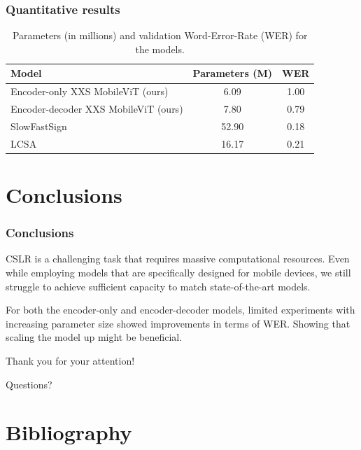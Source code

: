\documentclass[english, xcolor={table}]{beamer}
\begin{document}
\begin{frame}
  \frametitle{Quantitative results}

  \begin{table}[H]
    \centering
    \begin{tabular}{lcc}
      \toprule
      \textbf{Model} & \textbf{Parameters (M)} & \textbf{WER} \\
      \midrule
      Encoder-only XXS MobileViT (ours) & 6.09 & 1.00 \\
      Encoder-decoder XXS MobileViT (ours) & 7.80 & 0.79 \\
      SlowFastSign\cite{ahn_slowfast_2023} & 52.90 & 0.18 \\
      LCSA\cite{zuo_local_2022} & 16.17 & 0.21 \\
      \bottomrule
    \end{tabular}
    \caption{Parameters (in millions) and validation Word-Error-Rate (WER) for the models.}
  \end{table}
\end{frame}

\section{Conclusions}

\begin{frame}
  \frametitle{Conclusions}

  CSLR is a challenging task that requires \alert{massive} computational resources. Even while employing
  models that are \alert{specifically} designed for mobile devices, we still struggle to achieve sufficient
  capacity to match state-of-the-art models.

  For both the encoder-only and encoder-decoder models, limited experiments with increasing parameter size
  showed \alert{improvements} in terms of WER. Showing that scaling the model up might be beneficial.
\end{frame}

\begin{frame}
  
  \centering
  \Huge
  \alert{Thank you for your attention!}
  
  \alert{Questions?}


\end{frame}

\section{Bibliography}



\end{document}
